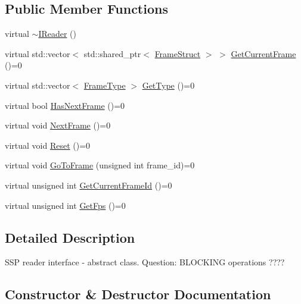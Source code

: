 \subsection*{Public Member Functions}
\begin{DoxyCompactItemize}
\item 
virtual \hyperlink{classmoetsi_1_1ssp_1_1IReader_ae1332862a7d81d99563f111ae36e142f}{$\sim$\+I\+Reader} ()
\item 
virtual std\+::vector$<$ std\+::shared\+\_\+ptr$<$ \hyperlink{structmoetsi_1_1ssp_1_1FrameStruct}{Frame\+Struct} $>$ $>$ \hyperlink{classmoetsi_1_1ssp_1_1IReader_a357439182128e3911d77335c136035c0}{Get\+Current\+Frame} ()=0
\item 
virtual std\+::vector$<$ \hyperlink{namespacemoetsi_1_1ssp_a46efdfa2cd5a28ead465dcc8006b5a87}{Frame\+Type} $>$ \hyperlink{classmoetsi_1_1ssp_1_1IReader_a4116c1931fde7bd66133934ffdca1cce}{Get\+Type} ()=0
\item 
virtual bool \hyperlink{classmoetsi_1_1ssp_1_1IReader_af9186ba41e136dc4ec3242b5dd55fa04}{Has\+Next\+Frame} ()=0
\item 
virtual void \hyperlink{classmoetsi_1_1ssp_1_1IReader_a49e82a786cca55248e27e7fac8f97a17}{Next\+Frame} ()=0
\item 
virtual void \hyperlink{classmoetsi_1_1ssp_1_1IReader_ad6e2ef78fc2466884aa877ecef54889d}{Reset} ()=0
\item 
virtual void \hyperlink{classmoetsi_1_1ssp_1_1IReader_a6f1be3c06538992cca6d550bd9566681}{Go\+To\+Frame} (unsigned int frame\+\_\+id)=0
\item 
virtual unsigned int \hyperlink{classmoetsi_1_1ssp_1_1IReader_ac292d83eb06dee277baaa06e281a562d}{Get\+Current\+Frame\+Id} ()=0
\item 
virtual unsigned int \hyperlink{classmoetsi_1_1ssp_1_1IReader_a9f6a8650ca290b011b8e5451eeae9f32}{Get\+Fps} ()=0
\end{DoxyCompactItemize}


\subsection{Detailed Description}
S\+SP reader interface -\/ abstract class. Question\+: B\+L\+O\+C\+K\+I\+NG operations ???? 

\subsection{Constructor \& Destructor Documentation}
\mbox{\label{classmoetsi_1_1ssp_1_1IReader_ae1332862a7d81d99563f111ae36e142f}} 
